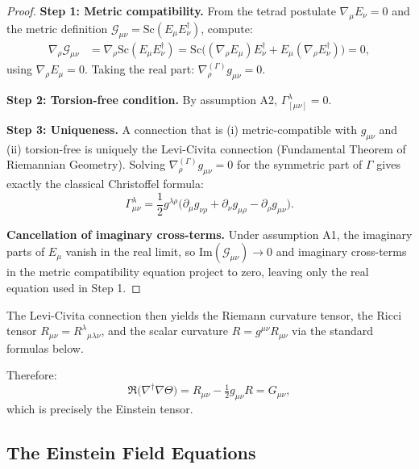 \begin{proof}
\textbf{Step 1: Metric compatibility.}
From the tetrad postulate $\nabla_\mu E_\nu = 0$ and the metric definition
$\mathcal{G}_{\mu\nu} = \mathrm{Sc}(E_\mu E_\nu^\dagger)$, compute:
\begin{align}
\nabla_\rho \mathcal{G}_{\mu\nu}
  &= \nabla_\rho \mathrm{Sc}(E_\mu E_\nu^\dagger)
   = \mathrm{Sc}\bigl((\nabla_\rho E_\mu) E_\nu^\dagger + E_\mu (\nabla_\rho E_\nu^\dagger)\bigr) = 0,
\end{align}
using $\nabla_\rho E_\mu = 0$.  Taking the real part: $\nabla^{(\Gamma)}_\rho g_{\mu\nu} = 0$.

\textbf{Step 2: Torsion-free condition.}
By assumption A2, $\Gamma^\lambda_{[\mu\nu]} = 0$.

\textbf{Step 3: Uniqueness.}
A connection that is (i) metric-compatible with $g_{\mu\nu}$ and (ii) torsion-free is
uniquely the Levi-Civita connection (Fundamental Theorem of Riemannian Geometry).
Solving $\nabla^{(\Gamma)}_\rho g_{\mu\nu} = 0$ for the symmetric part of $\Gamma$
gives exactly the classical Christoffel formula:
\begin{equation}
\Gamma^\lambda_{\mu\nu} = \frac{1}{2} g^{\lambda\rho}\bigl(\partial_\mu g_{\nu\rho} + \partial_\nu g_{\mu\rho} - \partial_\rho g_{\mu\nu}\bigr).
\end{equation}

\textbf{Cancellation of imaginary cross-terms.}
Under assumption A1, the imaginary parts of $E_\mu$ vanish in the real limit, so
$\mathrm{Im}(\mathcal{G}_{\mu\nu}) \to 0$ and imaginary cross-terms in the metric
compatibility equation project to zero, leaving only the real equation used in Step 1.
\end{proof}

The Levi-Civita connection then yields the Riemann curvature tensor, the Ricci tensor
$R_{\mu\nu} = R^\lambda{}_{\mu\lambda\nu}$, and the scalar curvature $R = g^{\mu\nu} R_{\mu\nu}$
via the standard formulas below.

Therefore:
\begin{equation}
\Re\big(\nabla^\dagger \nabla \Theta\big) = R_{\mu\nu} - \tfrac{1}{2} g_{\mu\nu} R = G_{\mu\nu},
\label{eq:real_projection}
\end{equation}
which is precisely the Einstein tensor.

\subsection{The Einstein Field Equations}

